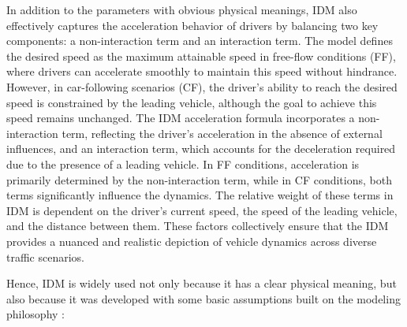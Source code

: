 \documentclass[a4paper,fleqn]{cas-sc}
\begin{document}
In addition to the parameters with obvious physical meanings, IDM also effectively captures the acceleration behavior of drivers by balancing two key components: a non-interaction term and an interaction term. The model defines the desired speed as the maximum attainable speed in free-flow conditions (FF), where drivers can accelerate smoothly to maintain this speed without hindrance. However, in car-following scenarios (CF), the driver's ability to reach the desired speed is constrained by the leading vehicle, although the goal to achieve this speed remains unchanged. The IDM acceleration formula incorporates a non-interaction term, reflecting the driver's acceleration in the absence of external influences, and an interaction term, which accounts for the deceleration required due to the presence of a leading vehicle. In FF conditions, acceleration is primarily determined by the non-interaction term, while in CF conditions, both terms significantly influence the dynamics. The relative weight of these terms in IDM is dependent on the driver's current speed, the speed of the leading vehicle, and the distance between them. These factors collectively ensure that the IDM provides a nuanced and realistic depiction of vehicle dynamics across diverse traffic scenarios.

Hence, IDM is widely used not only because it has a clear physical meaning, but also because it was developed with some basic assumptions built on the modeling philosophy \citep{treiberTrafficFlowDynamics2013}:
\end{document}
